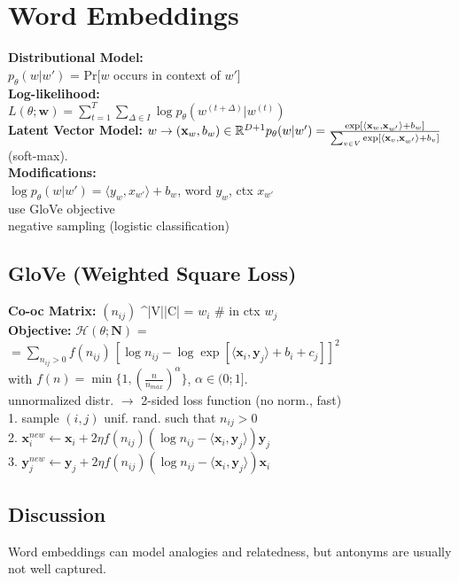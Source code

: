 \section{Word Embeddings}
\textbf{Distributional Model:}\\
$p_\theta(w|w')$ = Pr[$w$ occurs in context of $w'$]\\
\textbf{Log-likelihood:}\\
$L(\theta; \mathbf{w}) = \sum_{t=1}^T\sum_{\Delta \in I}{\log p_\theta(w^{(t+\Delta)}|w^{(t)})}$\\
\textbf{Latent Vector Model:} $w \rightarrow (\mathbf{x}_w, b_w) \in \mathbb{R}^{D+1} \\p_{\theta}(w|w') = \frac{\exp[\langle \mathbf{x}_w,\mathbf{x}_{w'}\rangle + b_w]}{\sum_{v\in V}{\exp[\langle \mathbf{x}_v,\mathbf{x}_{w'}\rangle + b_v ]}}$ (soft-max).\\
\textbf{Modifications:}\\
$\log p_{\theta}(w|w') = \langle  y_{w} , x_{w'} \rangle + b_w$,  word $y_w$, ctx $x_{w'}$\\
use GloVe objective\\
negative sampling (logistic classification)

\subsection*{GloVe (Weighted Square Loss)}
\textbf{Co-oc Matrix:} $(n_{ij})$ \in {}^{|V|\times|C|} = $ w_i$ \# in ctx $w_j$\\
\textbf{Objective:} $\mathcal{H}(\theta;\mathbf{N})$ =\\
$= \sum_{n_{ij} > 0} f(n_{ij})\,[\log n_{ij} - \log \exp[\langle \mathbf{x}_i, \mathbf{y}_j \rangle + b_i + c_j]]^2$\\
with $f(n) = \min\{1, (\frac{n}{n_{max}})^\alpha\}$, $\alpha \in (0;1]$.\\
unnormalized distr. $\rightarrow$ 2-sided loss function (no norm., fast)\\
1. sample $(i,j)$ unif. rand. such that $n_{ij}>0$\\
2. $\mathbf{x}_i^{new} \leftarrow \mathbf{x}_i + 2\eta f(n_{ij})(\log n_{ij} - \langle \mathbf{x}_i, \mathbf{y}_j \rangle)\mathbf{y}_j$\\
3. $\mathbf{y}_j^{new} \leftarrow \mathbf{y}_j + 2\eta f(n_{ij})(\log n_{ij} - \langle \mathbf{x}_i, \mathbf{y}_j \rangle)\mathbf{x}_i$

\subsection*{Discussion}
Word embeddings can model analogies and relatedness, but antonyms are usually not well captured.
